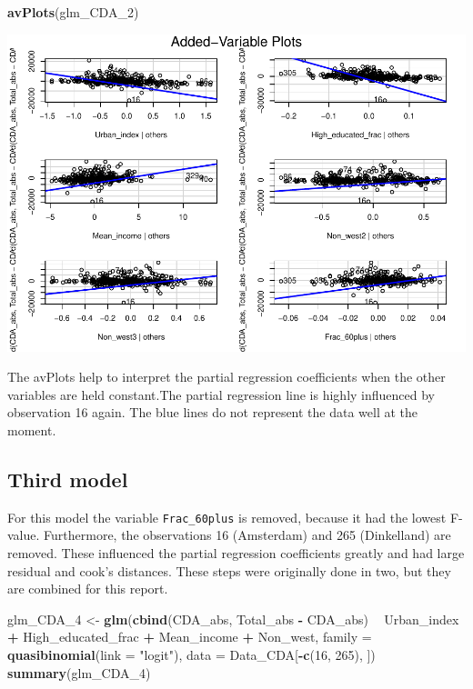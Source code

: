 \documentclass[11pt,]{article}
\newenvironment{Shaded}{\begin{snugshade}}{\end{snugshade}}
\newcommand{\KeywordTok}[1]{\textcolor[rgb]{0.13,0.29,0.53}{\textbf{#1}}}
\newcommand{\DataTypeTok}[1]{\textcolor[rgb]{0.13,0.29,0.53}{#1}}
\newcommand{\DecValTok}[1]{\textcolor[rgb]{0.00,0.00,0.81}{#1}}
\newcommand{\StringTok}[1]{\textcolor[rgb]{0.31,0.60,0.02}{#1}}
\newcommand{\OperatorTok}[1]{\textcolor[rgb]{0.81,0.36,0.00}{\textbf{#1}}}
\newcommand{\NormalTok}[1]{#1}
\begin{document}
\begin{Shaded}
\begin{Highlighting}[]
\KeywordTok{avPlots}\NormalTok{(glm_CDA_}\DecValTok{2}\NormalTok{)}
\end{Highlighting}
\end{Shaded}

\begin{center}\includegraphics{Report_files/figure-latex/unnamed-chunk-20-1} \end{center}

The avPlots help to interpret the partial regression coefficients when
the other variables are held constant.The partial regression line is
highly influenced by observation 16 again. The blue lines do not
represent the data well at the moment.

\subsection{Third model}\label{third-model}

For this model the variable \texttt{Frac\_60plus} is removed, because it
had the lowest F-value. Furthermore, the observations 16 (Amsterdam) and
265 (Dinkelland) are removed. These influenced the partial regression
coefficients greatly and had large residual and cook's distances. These
steps were originally done in two, but they are combined for this
report.

\begin{Shaded}
\begin{Highlighting}[]
\NormalTok{glm_CDA_}\DecValTok{4}\NormalTok{ <-}\StringTok{ }\KeywordTok{glm}\NormalTok{(}\KeywordTok{cbind}\NormalTok{(CDA_abs, Total_abs }\OperatorTok{-}\StringTok{ }\NormalTok{CDA_abs) }\OperatorTok{~}\StringTok{ }\NormalTok{Urban_index }\OperatorTok{+}\StringTok{ }\NormalTok{High_educated_frac }\OperatorTok{+}\StringTok{ }
\StringTok{    }\NormalTok{Mean_income }\OperatorTok{+}\StringTok{ }\NormalTok{Non_west, }\DataTypeTok{family =} \KeywordTok{quasibinomial}\NormalTok{(}\DataTypeTok{link =} \StringTok{"logit"}\NormalTok{), }\DataTypeTok{data =}\NormalTok{ Data_CDA[}\OperatorTok{-}\KeywordTok{c}\NormalTok{(}\DecValTok{16}\NormalTok{, }
    \DecValTok{265}\NormalTok{), ])}
\KeywordTok{summary}\NormalTok{(glm_CDA_}\DecValTok{4}\NormalTok{)}
\end{Highlighting}
\end{Shaded}
\end{document}
